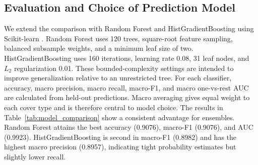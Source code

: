\documentclass{article}
\begin{document}
\FloatBarrier
\subsection{Evaluation and Choice of Prediction Model}
\label{subsec:evaluation}

We extend the comparison with Random Forest and HistGradientBoosting using Scikit-learn \cite{sklearn}. Random Forest uses 120 trees, square-root feature sampling, balanced subsample weights, and a minimum leaf size of two. HistGradientBoosting uses 160 iterations, learning rate 0.08, 31 leaf nodes, and $L_2$ regularization 0.01. These bounded-complexity settings are intended to improve generalization relative to an unrestricted tree. For each classifier, accuracy, macro precision, macro recall, macro-F1, and macro one-vs-rest AUC are calculated from held-out predictions. Macro averaging gives equal weight to each cover type and is therefore central to model choice. The results in Table~\ref{tab:model_comparison} show a consistent advantage for ensembles. Random Forest attains the best accuracy (0.9076), macro-F1 (0.9076), and AUC (0.9923). HistGradientBoosting is second in macro-F1 (0.8982) and has the highest macro precision (0.8957), indicating tight probability estimates but slightly lower recall.

\begin{table}[H]
  \centering
  \caption{Held-out test performance across the four classifiers.  CV-F1 refers to 5-fold stratified cross-validation within the 68,565-row training set (mean~$\pm$~std).  95\% CI is from 1,000 bootstrap resamples of the test set.}
  \label{tab:model_comparison}
  \small
\end{table}
\end{document}
